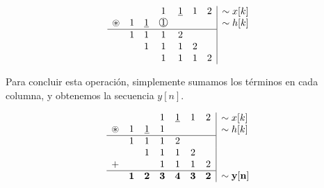 \documentclass[a4paper]{book}
\begin{document}
\begin{enumerate}
	      \[ \begin{array}{ccccccc}
			                  &   &               & 1                 & \underline{1} & 1 & 2 \\
			      \circledast & 1 & \underline{1} & \circledNumber{1} &               &   &   \\
			      \hline
			                  & 1 & 1             & 1                 & 2             &   &   \\
			                  &   & 1             & 1                 & 1             & 2 &   \\
			                  &   &               & 1                 & 1             & 1 & 2 \\
		      \end{array}
		      \begin{array}{|l}
			      \sim x[k]   \\
			      \sim h[k]   \\
			      \phantom{a} \\
			      \phantom{a} \\
			      \phantom{a}
		      \end{array}\]

	      Para concluir esta operación, simplemente sumamos los términos en cada columna, y obtenemos la secuencia $y[n]$.

	      \[ \begin{array}{ccccccc}
			                  &            &               & 1          & \underline{1} & 1          & 2          \\
			      \circledast & 1          & \underline{1} & 1          &               &            &            \\
			      \hline
			                  & 1          & 1             & 1          & 2             &            &            \\
			                  &            & 1             & 1          & 1             & 2          &            \\
			      +           &            &               & 1          & 1             & 1          & 2          \\
			      \hline
			                  & \mathbf{1} & \mathbf{2}    & \mathbf{3} & \mathbf{4}    & \mathbf{3} & \mathbf{2} \\
		      \end{array}
		      \begin{array}{|l}
			      \sim x[k]   \\
			      \sim h[k]   \\
			      \phantom{a} \\
			      \phantom{a} \\
			      \phantom{a} \\
			      \mathbf{\sim y[n]}
		      \end{array}\]
\end{enumerate}
\end{document}
